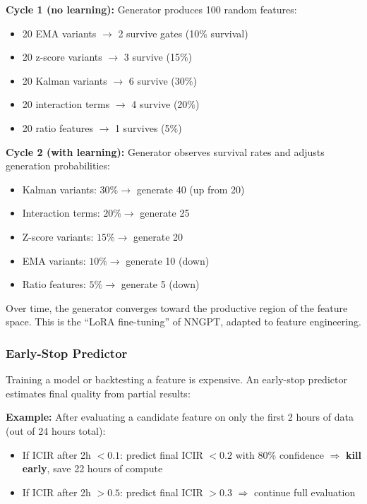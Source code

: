 \documentclass[11pt,a4paper]{article}
\begin{document}
\textbf{Cycle 1 (no learning):} Generator produces 100 random features:
\begin{itemize}
    \item 20 EMA variants $\to$ 2 survive gates (10\% survival)
    \item 20 z-score variants $\to$ 3 survive (15\%)
    \item 20 Kalman variants $\to$ 6 survive (30\%)
    \item 20 interaction terms $\to$ 4 survive (20\%)
    \item 20 ratio features $\to$ 1 survives (5\%)
\end{itemize}

\textbf{Cycle 2 (with learning):} Generator observes survival rates and adjusts generation probabilities:
\begin{itemize}
    \item Kalman variants: $30\% \to$ generate 40 (up from 20)
    \item Interaction terms: $20\% \to$ generate 25
    \item Z-score variants: $15\% \to$ generate 20
    \item EMA variants: $10\% \to$ generate 10 (down)
    \item Ratio features: $5\% \to$ generate 5 (down)
\end{itemize}

Over time, the generator converges toward the productive region of the feature space. This is the ``LoRA fine-tuning'' of NNGPT, adapted to feature engineering.

\subsubsection{Early-Stop Predictor}

Training a model or backtesting a feature is expensive. An early-stop predictor estimates final quality from partial results:

\textbf{Example:} After evaluating a candidate feature on only the first 2 hours of data (out of 24 hours total):
\begin{itemize}
    \item If ICIR after 2h $< 0.1$: predict final ICIR $< 0.2$ with 80\% confidence $\Rightarrow$ \textbf{kill early}, save 22 hours of compute
    \item If ICIR after 2h $> 0.5$: predict final ICIR $> 0.3$ $\Rightarrow$ continue full evaluation
\end{itemize}
\end{document}
